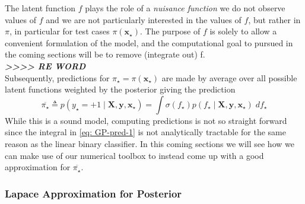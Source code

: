 The latent function $f$ plays the role of a {\it nuisance function} we do not observe values of $f$ and we are not particularly interested in the values of $f$, but rather in $\pi$, in particular for test cases $\pi \left( \bm{x}_{\star} \right)$. The purpose of $f$ is solely to allow a convenient formulation of the model, and the computational goal to pursued in the coming sections will be to remove (integrate out) f.\\
{\em \textbf{>>>> RE WORD}}\\
Subsequently, predictions for $\pi_{\star} = \pi \left( \bm{x}_{\star} \right)$ are made by average over all possible latent functions weighted by the posterior giving the prediction
\begin{equation} \label{eq: GP-pred-1}
    \overline{\pi_{\star}} \triangleq p \left( y_{\star} = +1 \mid \bm{X} , \bm{y} , \bm{x}_{\star} \right) = \int \sigma \left( f_{\star} \right) p \left( f_{\star} \mid \bm{X} , \bm{y} , \bm{x}_{\star} \right) \; d f_{\star}
\end{equation}
While this is a sound model, computing predictions is not so straight forward since the integral in \ref{eq: GP-pred-1} is not analytically tractable for the same reason as the linear binary classifier. In this coming sections we will see how we can make use of our numerical toolbox to instead come up with a good approximation for $\overline{\pi_{\star}}$.

\subsubsection{Lapace Approximation for Posterior}\label{Section1.6.2}

